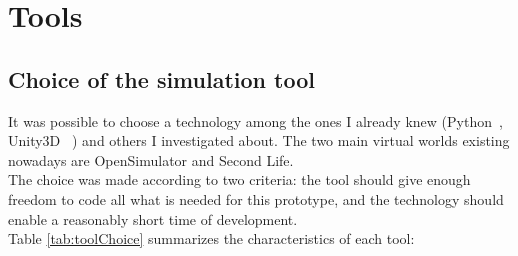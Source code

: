 \section{Tools}
\label{sec:devtools}


\subsection{Choice of the simulation tool}
\label{sec:toolsConstraints}
It was possible to choose a technology among the ones I already knew (Python~\cite{pythonWebsite}, Unity3D~\cite{Unity3DWebsite} ) and others I investigated about. The two main virtual worlds existing nowadays are OpenSimulator and Second Life. 
\\The choice was made according to two criteria: the tool should give enough freedom to code all what is needed for this prototype, and the technology should enable a reasonably short time of development.
\\Table \ref{tab:toolChoice} summarizes the characteristics of each tool:

\begin{table}
\caption{Comparizon between different 3D development tools}
\label{tab:toolChoice}
    
\end{table}


